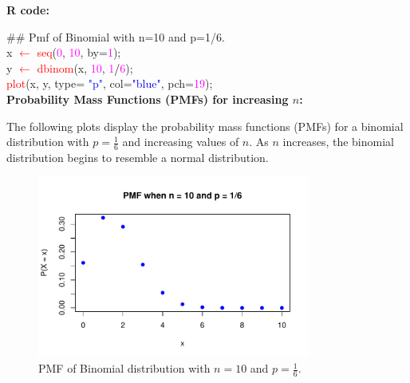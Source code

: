 \noindent\textcolor{gray!40}{\textbf{R code:}}

\vspace{0.5em}

{\ttfamily
\textcolor{violet!70!black}{\#\# Pmf of Binomial with n=10 and p=1/6.} \\[1em]

x \textcolor{red}{$\leftarrow$} \textcolor{red}{seq}(\textcolor{magenta}{0}, \textcolor{magenta}{10}, \textcolor{green!50!black}{by}=\textcolor{magenta}{1}); \\[1em]

y \textcolor{red}{$\leftarrow$} \textcolor{red}{dbinom}(x, \textcolor{magenta}{10}, \textcolor{magenta}{1}\textcolor{black}{/}\textcolor{magenta}{6}); \\[1em]

\textcolor{red}{plot}(x, y, \textcolor{green!50!black}{type}= \textcolor{blue}{"p"}, \textcolor{green!50!black}{col}=\textcolor{blue}{"blue"}, \textcolor{green!50!black}{pch}=\textcolor{magenta}{19});
}\\


\textbf{Probability Mass Functions (PMFs) for increasing \(n\):}

\vspace{0.5em}

The following plots display the probability mass functions (PMFs) for a binomial distribution with \( p = \frac{1}{6} \) and increasing values of \( n \). As \( n \) increases, the binomial distribution begins to resemble a normal distribution.


\begin{figure}[h!]
  \centering
 \includegraphics[width=0.8\textwidth]{Section4/pmf_plot.pdf}
 \caption{PMF of Binomial distribution with \(n = 10\) and \(p = \frac{1}{6}\).}
\end{figure}

